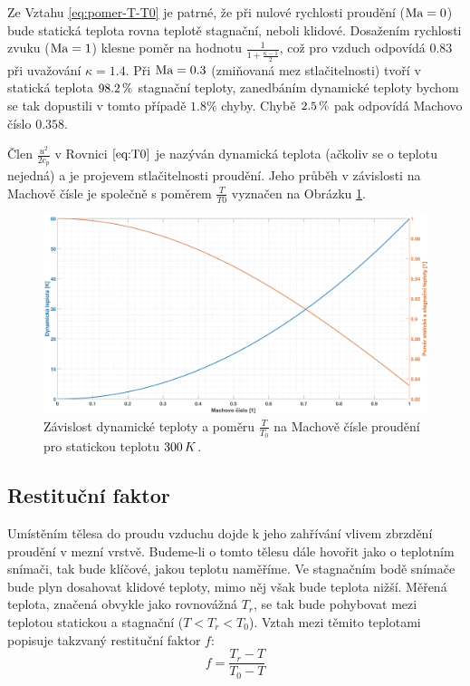     Ze Vztahu \ref{eq:pomer-T-T0} je patrné, že při nulové rychlosti proudění ($\textrm{Ma} = 0$) bude statická teplota rovna teplotě stagnační, neboli klidové. Dosažením rychlosti zvuku ($\textrm{Ma} = 1$) klesne poměr na hodnotu $\frac{1}{1+\frac{\kappa - 1}{2}}$, což pro vzduch odpovídá $0.83$ při uvažování $\kappa = 1.4$. Při $\textrm{Ma} = 0.3$ (zmiňovaná mez stlačitelnosti) tvoří v statická teplota $98.2 \, \%$ stagnační teploty, zanedbáním dynamické teploty bychom se tak dopustili v tomto případě $1.8\%$ chyby. Chybě $2.5 \, \%$ pak odpovídá Machovo číslo $0.358$.

    \clearpage

    Člen $\frac{u^2}{2 c_p}$ v Rovnici $\ref{eq:T0}$ je nazýván dynamická teplota (ačkoliv se o teplotu nejedná) a je projevem stlačitelnosti proudění. Jeho průběh v závislosti na Machově čísle je společně s poměrem $\frac{T}{T0}$ vyznačen na Obrázku \ref{fig:pomer-T-T0}.

    \begin{figure}[ht!]
        \centering
        \includegraphics[width=\textwidth]{100_MERENI_TEPLOT/pomer_T_T0.eps}
        \caption{Závislost dynamické teploty a poměru $\frac{T}{T_0}$ na Machově čísle proudění pro statickou teplotu $300 \, K$.}
        \label{fig:pomer-T-T0}
    \end{figure}

    \subsection{Restituční faktor}

    Umístěním tělesa do proudu vzduchu dojde k jeho zahřívání vlivem zbrzdění proudění v mezní vrstvě. Budeme-li o tomto tělesu dále hovořit jako o teplotním snímači, tak bude klíčové, jakou teplotu naměříme. Ve stagnačním bodě snímače bude plyn dosahovat klidové teploty, mimo něj však bude teplota nižší. Měřená teplota, značená obvykle jako rovnovážná $T_r$, se tak bude pohybovat mezi teplotou statickou a stagnační ($T < T_r < T_0$). Vztah mezi těmito teplotami popisuje takzvaný restituční faktor $f$:
    \begin{equation} \label{eq:restitucni-faktor}
        f = \frac{T_r - T}{T_0 - T}
    \end{equation}

